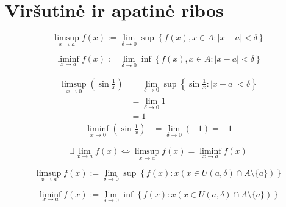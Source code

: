 \section{Viršutinė ir apatinė ribos}

\begin{defn}
  \begin{equation*}
    \limsup _{x \to a} f(x) := 
      \lim_{\delta \to 0} 
      \sup \left\{ f(x), x \in A : |x - a| < \delta \right\}
  \end{equation*}
\end{defn}

\begin{defn}
  \begin{equation*}
    \liminf _{x \to a} f(x) :=
      \lim_{\delta \to 0}
      \inf \left\{ f(x), x \in A : |x - a| < \delta \right\}
  \end{equation*}
\end{defn}

\begin{exmp}
  \begin{align*}
    \limsup _{x \to 0} \left( \sin \frac{1}{x} \right) 
    &= \lim_{\delta \to 0} \sup 
      \left\{ \sin \frac{1}{x} : |x - a| < \delta \right\} \\
    &= \lim_{\delta \to 0} 1 \\
    &= 1
  \end{align*}
  \begin{align*}
    \liminf _{x \to 0} \left( \sin \frac{1}{x} \right) 
    &= \lim_{\delta \to 0} (-1) = -1
  \end{align*}
\end{exmp}

\begin{prop}
  \begin{equation*}
    \exists \lim_{x \to a} f(x) \iff
    \limsup _{x \to a} f(x) = \liminf _{x \to a} f(x)
  \end{equation*}
\end{prop}

\begin{defn}
  \begin{equation*}
    \limsup _{x \to a} f(x) :=
      \lim_{\delta \to 0}
      \sup \left\{ f(x) : x 
        (x \in U(a, \delta) \cap A \setminus \{a\}) 
        \right\}
  \end{equation*}
\end{defn}

\begin{defn}
  \begin{equation*}
    \liminf _{x \to a} f(x) :=
      \lim_{\delta \to 0}
      \inf \left\{ f(x) : x 
        (x \in U(a, \delta) \cap A \setminus \{a\}) 
        \right\}
  \end{equation*}
\end{defn}

